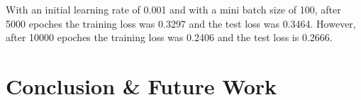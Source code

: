 \documentclass[conference]{IEEEtran}
\begin{document}
With an initial learning rate of 0.001 and with a mini batch size of 100, after 5000 epoches the training loss was 0.3297 and the test loss was 0.3464. However, after 10000 epoches the training loss was 0.2406 and the test loss is 0.2666.



\section{Conclusion \& Future Work}\label{Conclusion Future Work}





















\end{document}
